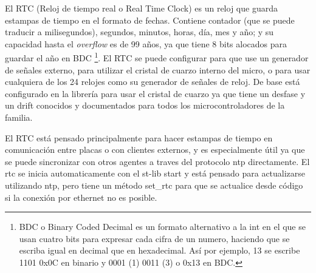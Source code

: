 \documentclass{report}
\begin{document}
El RTC (Reloj de tiempo real o Real Time Clock) es un reloj que guarda estampas de tiempo en el formato de fechas. Contiene contador (que se puede traducir a milisegundos), segundos, minutos, horas, día, mes y año; y su capacidad hasta el \textit{overflow} es de 99 años, ya que tiene 8 bits alocados para guardar el año en BDC \footnote{BDC o Binary Coded Decimal es un formato alternativo a la int en el que se usan cuatro bits para expresar cada cifra de un numero, haciendo que se escriba igual en decimal que en hexadecimal. Así por ejemplo, 13 se escribe 1101 0x0C en binario y 0001 (1) 0011 (3) o 0x13 en BDC. }. El RTC se puede configurar para que use un generador de señales externo, para utilizar el cristal de cuarzo interno del micro, o para usar cualquiera de los 24 relojes como su generador de señales de reloj. De base está configurado en la librería para usar el cristal de cuarzo ya que tiene un desfase y un drift conocidos y documentados para todos los microcontroladores de la familia. \par 
El RTC está pensado principalmente para hacer estampas de tiempo en comunicación entre placas o con clientes externos, y es especialmente útil ya que se puede sincronizar con otros agentes a traves del protocolo ntp directamente. El rtc se inicia automaticamente con el st-lib start y está pensado para actualizarse utilizando ntp, pero tiene un método set\_rtc para que se actualice desde código si la conexión por ethernet no es posible.
\end{document}
